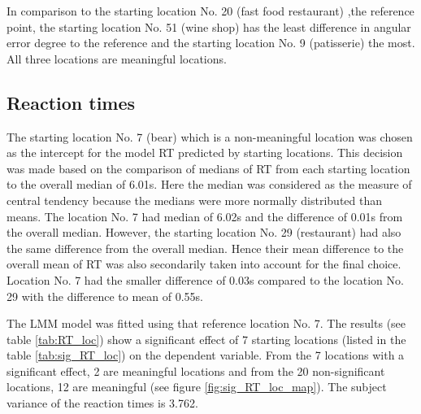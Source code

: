In comparison to the starting location No. 20 (fast food restaurant) ,the reference point, the starting location No. 51 (wine shop) has the least difference in angular error degree to the reference and the starting location No. 9 (patisserie) the most. All three locations are meaningful locations.

\subsection{Reaction times}

The starting location No. 7 (bear) which is a non-meaningful location was chosen as the intercept for the model RT predicted by starting locations. This decision was made based on the comparison of medians of RT from each starting location to the overall median of 6.01s. Here the median was considered as the measure of central tendency because the medians were more normally distributed than means. The location No. 7 had median of 6.02s and the difference of 0.01s from the overall median. However, the starting location No. 29 (restaurant) had also the same difference from the overall median. Hence their mean difference to the overall mean of RT was also secondarily taken into account for the final choice. Location No. 7 had the smaller difference of 0.03s compared to the location No. 29 with the difference to mean of 0.55s. 

The LMM model was fitted using that reference location No. 7. The results (see table \ref{tab:RT_loc}) show a significant effect of 7 starting locations (listed in the table \ref{tab:sig_RT_loc}) on the dependent variable. From the 7 locations with a significant effect, 2 are meaningful locations and from the 20 non-significant locations, 12 are meaningful (see figure \ref{fig:sig_RT_loc_map}). The subject variance of the reaction times is 3.762.


\begingroup %
\setlength\tabcolsep{3pt}
\footnotesize

\setlength\LTcapwidth{\textwidth} %

\setlength\LTleft{5pt}            %
\setlength\LTright{15pt}           %

